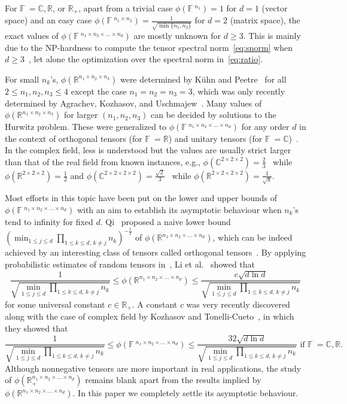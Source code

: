 \documentclass[11pt]{article}
\newcommand{\C}{\mathbb{C}}
\newcommand{\R}{\mathbb{R}}
\newcommand{\BF}{\mathbb{F}\:\!}
\begin{document}
For $\BF=\C,\R$, or $\R_+$, apart from a trivial case $\phi(\BF^{n_1})=1$ for $d=1$ (vector space) and an easy case $\phi(\BF^{n_1\times n_2})=\frac{1}{\sqrt{\min\{n_1,n_2\}}}$ for $d=2$ (matrix space), the exact values of $\phi(\BF^{n_1\times n_2\times \dots \times n_d})$ are mostly unknown for $d\ge3$. This is mainly due to the NP-hardness to compute the tensor spectral norm~\eqref{eq:snorm} when $d\ge3$~\cite{HLZ10}, let alone the optimization over the spectral norm in~\eqref{eq:ratio}.

For small $n_k$'s, $\phi(\R^{n_1\times n_2\times n_3})$ were determined by K\"uhn and Peetre~\cite{KP06} for all $2\le n_1,n_2,n_3\le 4$ except the case $n_1=n_2=n_3=3$, which was only recently determined by Agrachev, Kozhasov, and Uschmajew~\cite{AKU20}. Many values of $\phi(\R^{n_1\times n_2\times n_3})$ for larger $(n_1,n_2,n_3)$ can be decided by solutions to the Hurwitz problem. These were generalized to $\phi(\BF^{n_1\times n_2\times \dots \times n_d})$ for any order $d$ in the context of orthogonal tensors (for $\BF=\R$) and unitary tensors (for $\BF=\C$)~\cite{LNSU18}. In the complex field, less is understood but the values are usually strict larger than that of the real field from known instances, e.g., $\phi(\C^{2\times 2\times 2})=\frac{2}{3}$~\cite{CKP00} while $\phi(\R^{2\times 2\times 2})=\frac{1}{2}$ and $\phi(\C^{2\times 2\times 2\times  2})=\frac{\sqrt{2}}{3}$~\cite{DFLW17} while $\phi(\R^{2\times 2\times 2\times 2})=\frac{1}{\sqrt{8}}$.

Most efforts in this topic have been put on the lower and upper bounds of $\phi(\BF^{n_1\times n_2\times \dots \times n_d})$ with an aim to establish its asymptotic behaviour when $n_k$'s tend to infinity for fixed $d$. Qi~\cite{Q11} proposed a naive lower bound $\left(\min_{1\le j\le d}\prod_{1\le k\le d,\,k\neq j}n_k\right)^{-\frac{1}{2}}$ of $\phi(\R^{n_1\times n_2\times \dots \times n_d})$, which can be indeed achieved by an interesting class of tensors called orthogonal tensors~\cite{LNSU18}. By applying probabilistic estimates of random tensors in~\cite{TS14}, Li et al.~\cite{LNSU18} showed that
\begin{equation}\label{eq:uppern}
\frac{1}{\sqrt{\min_{1\le j\le d}\prod_{1\le k\le d,\,k\neq j}n_k}} \le \phi(\R^{n_1\times n_2\times \dots \times n_d})
\le \frac{c\sqrt{d\ln d}}{\sqrt{\min_{1\le j\le d}\prod_{1\le k\le d,\,k\neq j}n_k}}
\end{equation}
for some universal constant $c\in\R_+$. A constant $c$ was very recently discovered along with the case of complex field by Kozhasov and Tonelli-Cueto~\cite{KT22}, in which they showed that
$$
\frac{1}{\sqrt{\min_{1\le j\le d}\prod_{1\le k\le d,\,k\neq j}n_k}} \le \phi(\BF^{n_1\times n_2\times \dots \times n_d})
\le \frac{32\sqrt{d\ln d}}{\sqrt{\min_{1\le j\le d}\prod_{1\le k\le d,\,k\neq j}n_k}} \mbox{ if }\BF=\C,\R.
$$
Although nonnegative tensors are more important in real applications, the study of $\phi(\R_+^{n_1\times n_2\times \dots \times n_d})$ remains blank apart from the results implied by $\phi(\R^{n_1\times n_2\times \dots \times n_d})$. In this paper we completely settle its asymptotic behaviour.
\end{document}
